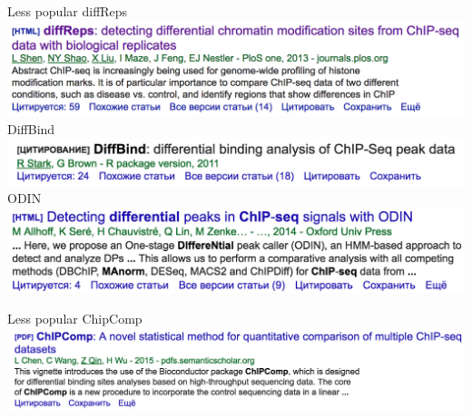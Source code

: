 \documentclass{beamer}
\begin{document}
\begin{frame}{Less popular}
diffReps\\
\includegraphics[width=\linewidth]{diffreps.png}\\
DiffBind\\
\includegraphics[width=\linewidth]{DiffBind.png}\\
ODIN\\
\includegraphics[width=\linewidth]{ODIN.png}\\
\end{frame}
\begin{frame}{Less popular}
ChipComp\\
\includegraphics[width=\linewidth]{ChipComp.png}\\
\end{frame}



\begin{frame}
\vspace{4cm}
\\[3cm]
\end{frame}
\end{document}
